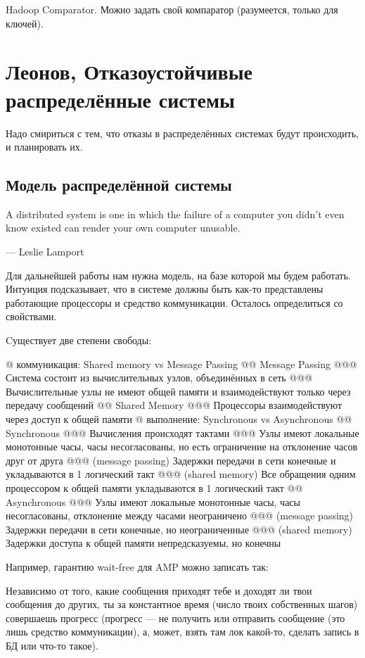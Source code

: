 Hadoop Comparator.
Можно задать свой компаратор (разумеется, только для ключей).

\section{Леонов, Отказоустойчивые распределённые системы}

Надо смириться с тем, что отказы в распределённых системах будут происходить, и планировать их.

\subsection{Модель распределённой системы}

A distributed system is one in which the failure of a computer you didn’t even know existed can render your own computer unusable.

--- Leslie Lamport

Для дальнейшей работы нам нужна модель, на базе которой мы будем работать. Интуиция подсказывает, что в системе должны быть как-то представлены работающие процессоры и средство коммуникации. Осталось определиться со свойствами.

Cуществует две степени свободы:
\begin{el}[ul]
@ коммуникация: Shared memory vs Message Passing
@@ Message Passing
@@@ Система состоит из вычислительных узлов, объединённых в сеть
@@@ Вычислительные узлы не имеют общей памяти и взаимодействуют только через передачу сообщений
@@ Shared Memory
@@@ Процессоры взаимодействуют через доступ к общей памяти
@ выполнение: Synchronous vs Asynchronous
@@ Synchronous
@@@ Вычисления происходят тактами
@@@ Узлы имеют локальные монотонные часы, часы несогласованы, но есть ограничение на отклонение часов друг от друга
@@@ (message passing) Задержки передачи в сети конечные и укладываются в 1 логический такт
@@@ (shared memory) Все обращения одним процессором к общей памяти укладываются в 1 логический такт
@@ Asynchronous
@@@ Узлы имеют локальные монотонные часы, часы несогласованы, отклонение между часами неограничено
@@@ (message passing) Задержки передачи в сети конечные, но неограниченные
@@@ (shared memory) Задержки доступа к общей памяти непредсказуемы, но конечны
\end{el}

Например, гарантию wait-free для AMP можно записать так:

Независимо от того, какие сообщения приходят тебе и доходят ли твои сообщения до других, ты за константное время (число твоих собственных шагов)  совершаешь прогресс (прогресс --- не получить или отправить сообщение (это лишь средство коммуникации), а, может, взять там лок какой-то, сделать  запись в БД или что-то такое).



